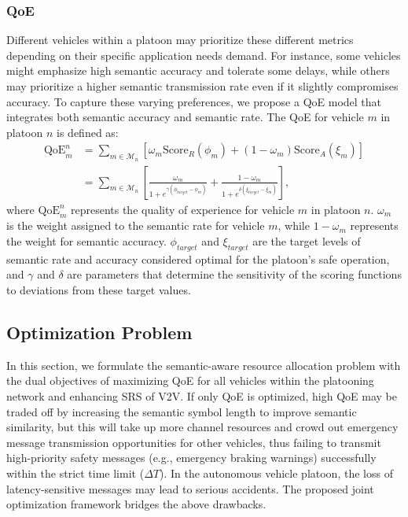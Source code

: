 \documentclass[10pt, lettersize,journal]{IEEEtran}
\begin{document}
	\subsubsection{QoE}
	Different vehicles within a platoon may prioritize these different metrics depending on their specific application needs demand. For instance, some vehicles might emphasize high semantic accuracy and tolerate some delays, while others may prioritize a higher semantic transmission rate even if it slightly compromises accuracy. To capture these varying preferences, we propose a QoE model that integrates both semantic accuracy and semantic rate. The QoE for vehicle \(m\) in platoon \(n\) is defined as:
	\begin{equation}\label{eq17}
		\begin{aligned}
			\text{QoE}_m^n &= \sum_{m \in \mathcal{M}_{n}} \left[\omega_m \text{Score}_R(\phi_m) + (1 - \omega_m) \text{Score}_A(\xi_m)\right] \\
			&= \sum_{m \in \mathcal{M}_{n}} \left[\frac{\omega_m}{1 + e^{\gamma (\phi_{target} - \phi_m)}} + \frac{1 - \omega_m}{1 + e^{\delta (\xi_{target} - \xi_m)}}\right],
		\end{aligned}
	\end{equation}
	where \(\text{QoE}_m^n\) represents the quality of experience for vehicle \(m\) in platoon \(n\). \(\omega_m\) is the weight assigned to the semantic rate for vehicle \(m\), while \(1 - \omega_m\) represents the weight for semantic accuracy. \(\phi_{target}\) and \(\xi_{target}\) are the target levels of semantic rate and accuracy considered optimal for the platoon's safe operation, and \(\gamma\) and \(\delta\) are parameters that determine the sensitivity of the scoring functions to deviations from these target values.
	
	\subsection{Optimization Problem}
	In this section, we formulate the semantic-aware resource allocation problem with the dual objectives of maximizing QoE for all vehicles within the platooning network and enhancing SRS of V2V. If only QoE is optimized, high QoE may be traded off by increasing the semantic symbol length to improve semantic similarity, but this will take up more channel resources and crowd out emergency message transmission opportunities for other vehicles, thus failing to transmit high-priority safety messages (e.g., emergency braking warnings) successfully within the strict time limit (\(\Delta T\)). In the autonomous vehicle platoon, the loss of latency-sensitive messages may lead to serious accidents. The proposed joint optimization framework bridges the above drawbacks.
	
\end{document}
